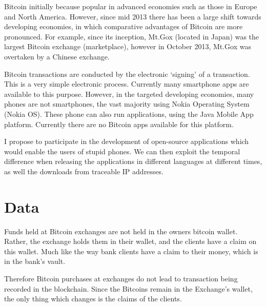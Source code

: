 \begin{refsection}
Bitcoin initially because popular in advanced economies such as those in Europe and North America.
However, since mid 2013 there has been a large shift towards developing economies,
in which comparative advantages of Bitcoin are more pronounced.
For example, since its inception, Mt.Gox (located in Japan) was the largest Bitcoin exchange (marketplace), however in October 2013, Mt.Gox was overtaken by a Chinese exchange.

Bitcoin transactions are conducted by the electronic `signing' of a transaction.
This is a very simple electronic process.
Currently many smartphone apps are available to this purpose.
However, in the targeted developing economies, many phones are not smartphones, the vast majority using Nokia Operating System (Nokia OS).
 These phone can also run applications, using the Java Mobile App platform. Currently there are no Bitcoin apps available for this platform.

I propose to participate in the development of open-source applications which would enable the users of stupid phones.
We can then exploit the temporal difference when releasing the applications in different languages at different times,
as well the downloads from traceable IP addresses.

\section{Data}
\label{btc:data}
Funds held at Bitcoin exchanges are not held in the owners bitcoin wallet.
Rather, the exchange holds them in their wallet, and the clients have a claim on this wallet.
Much like the way bank clients have a claim to their money, which is in the bank's vault.

Therefore Bitcoin purchases at exchanges do not lead to transaction being recorded in the blockchain.
Since the Bitcoins remain in the Exchange's wallet, the only thing which changes is the claims of the clients.


\end{refsection}
